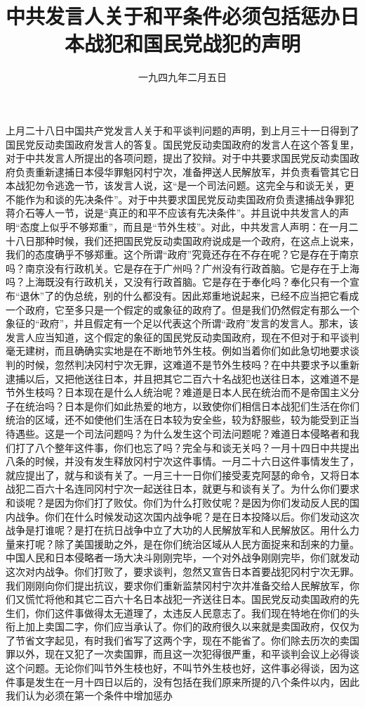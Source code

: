 
\title{中共发言人关于和平条件必须包括惩办日本战犯和国民党战犯的声明}
\date{一九四九年二月五日}
\maketitle


上月二十八日中国共产党发言人关于和平谈判问题的声明，到上月三十一日得到了国民党反动卖国政府发言人的答复。国民党反动卖国政府的发言人在这个答复里，对于中共发言人所提出的各项问题，提出了狡辩。对于中共要求国民党反动卖国政府负责重新逮捕日本侵华罪魁冈村宁次，准备押送人民解放军，并负责看管其它日本战犯勿令逃逸一节，该发言人说，这“是一个司法问题。这完全与和谈无关，更不能作为和谈的先决条件”。对于中共要求国民党反动卖国政府负责逮捕战争罪犯蒋介石等人一节，说是“真正的和平不应该有先决条件”。并且说中共发言人的声明“态度上似乎不够郑重”，而且是“节外生枝”。对此，中共发言人声明：在一月二十八日那种时候，我们还把国民党反动卖国政府说成是一个政府，在这点上说来，我们的态度确乎不够郑重。这个所谓“政府”究竟还存在不存在呢？它是存在于南京吗？南京没有行政机关。它是存在于广州吗？广州没有行政首脑。它是存在于上海吗？上海既没有行政机关，又没有行政首脑。它是存在于奉化吗？奉化只有一个宣布“退休”了的伪总统，别的什么都没有。因此郑重地说起来，已经不应当把它看成一个政府，它至多只是一个假定的或象征的政府了。但是我们仍然假定有那么一个象征的“政府”，并且假定有一个足以代表这个所谓“政府”发言的发言人。那末，该发言人应当知道，这个假定的象征的国民党反动卖国政府，现在不但对于和平谈判毫无建树，而且确确实实地是在不断地节外生枝。例如当着你们如此急切地要求谈判的时候，忽然判决冈村宁次无罪，这难道不是节外生枝吗？在中共要求予以重新逮捕以后，又把他送往日本，并且把其它二百六十名战犯也送往日本，这难道不是节外生枝吗？日本现在是什么人统治呢？难道是日本人民在统治而不是帝国主义分子在统治吗？日本是你们如此热爱的地方，以致使你们相信日本战犯们生活在你们统治的区域，还不如使他们生活在日本较为安全些，较为舒服些，较为能受到正当待遇些。这是一个司法问题吗？为什么发生这个司法问题呢？难道日本侵略者和我们打了八个整年这件事，你们也忘了吗？完全与和谈无关吗？一月十四日中共提出八条的时候，并没有发生释放冈村宁次这件事情。一月二十六日这件事情发生了，就应提出了，就与和谈有关了。一月三十一日你们接受麦克阿瑟的命令，又将日本战犯二百六十名连同冈村宁次一起送往日本，就更与和谈有关了。为什么你们要求和谈呢？是因为你们打了败仗。你们为什么打败仗呢？是因为你们发动反人民的国内战争。你们在什么时候发动这次国内战争呢？是在日本投降以后。你们发动这次战争是打谁呢？是打在抗日战争中立了大功的人民解放军和人民解放区。用什么力量来打呢？除了美国援助之外，是在你们统治区域从人民方面捉来和刮来的力量。中国人民和日本侵略者一场大决斗刚刚完毕，一个对外战争刚刚完毕，你们就发动这次对内战争。你们打败了，要求谈判，忽然又宣告日本首要战犯冈村宁次无罪。我们刚刚向你们提出抗议，要求你们重新监禁冈村宁次并准备交给人民解放军，你们又慌忙将他和其它二百六十名日本战犯一齐送往日本。国民党反动卖国政府的先生们，你们这件事做得太无道理了，太违反人民意志了。我们现在特地在你们的头衔上加上卖国二字，你们应当承认了。你们的政府很久以来就是卖国政府，仅仅为了节省文字起见，有时我们省写了这两个字，现在不能省了。你们除去历次的卖国罪以外，现在又犯了一次卖国罪，而且这一次犯得很严重，和平谈判会议上必得谈这个问题。无论你们叫节外生枝也好，不叫节外生枝也好，这件事必得谈，因为这件事是发生在一月十四日以后的，没有包括在我们原来所提的八个条件以内，因此我们认为必须在第一个条件中增加惩办